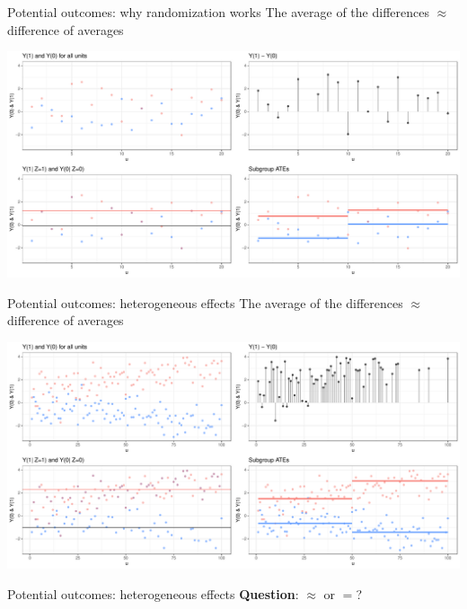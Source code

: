 \documentclass[
  11pt,
  ignorenonframetext,
]{beamer}
\begin{document}
\begin{frame}{Potential outcomes: why randomization works}
\protect\hypertarget{potential-outcomes-why-randomization-works}{}
The average of the differences \(\approx\) difference of averages

\includegraphics{2.1_causality_files/figure-beamer/unnamed-chunk-4-1.pdf}
\end{frame}

\begin{frame}{Potential outcomes: heterogeneous effects}
\protect\hypertarget{potential-outcomes-heterogeneous-effects}{}
The average of the differences \(\approx\) difference of averages

\includegraphics{2.1_causality_files/figure-beamer/unnamed-chunk-5-1.pdf}
\end{frame}

\begin{frame}{Potential outcomes: heterogeneous effects}
\protect\hypertarget{potential-outcomes-heterogeneous-effects-1}{}
\textbf{Question}: \(\approx\) or \(=\)?
\end{frame}
\end{document}
